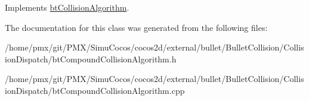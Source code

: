Implements \hyperlink{classbtCollisionAlgorithm}{bt\+Collision\+Algorithm}.



The documentation for this class was generated from the following files\+:\begin{DoxyCompactItemize}
\item 
/home/pmx/git/\+P\+M\+X/\+Simu\+Cocos/cocos2d/external/bullet/\+Bullet\+Collision/\+Collision\+Dispatch/bt\+Compound\+Collision\+Algorithm.\+h\item 
/home/pmx/git/\+P\+M\+X/\+Simu\+Cocos/cocos2d/external/bullet/\+Bullet\+Collision/\+Collision\+Dispatch/bt\+Compound\+Collision\+Algorithm.\+cpp\end{DoxyCompactItemize}
